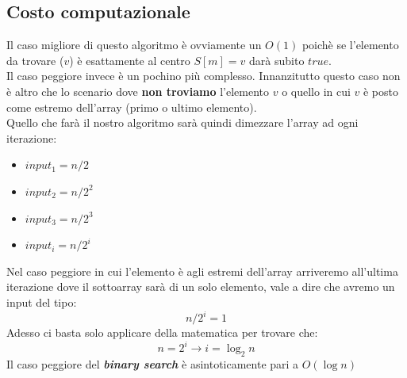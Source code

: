 \documentclass{article}
\begin{document}
\subsection*{Costo computazionale}
Il caso migliore di questo algoritmo è ovviamente un $O(1)$ poichè se 
l'elemento da trovare ($v$) è esattamente al centro $S[m] = v$ darà 
subito $true$. \\
Il caso peggiore invece è un pochino più complesso. Innanzitutto questo caso
non è altro che lo scenario dove \textbf{non troviamo} l'elemento $v$ o quello
in cui $v$ è posto come estremo dell'array (primo o ultimo elemento). \\
Quello che farà il nostro algoritmo sarà quindi dimezzare l'array ad ogni 
iterazione:
\begin{itemize}
  \item $input_1 = n/2$
  \item $input_2 = n/2^2$
  \item $input_3 = n/2^3$
  \item $input_i = n/2^i$
\end{itemize}
Nel caso peggiore in cui l'elemento è agli estremi dell'array arriveremo 
all'ultima iterazione dove il sottoarray sarà di un solo elemento, vale a dire
che avremo un input del tipo: 
\[ n/2^i = 1 \]
Adesso ci basta solo applicare della matematica per trovare che:
\[ n = 2^i \rightarrow i = \log_2 n\]
Il caso peggiore del \textbf{\textit{binary search}}
è asintoticamente pari a $O(\log n)$
\end{document}
